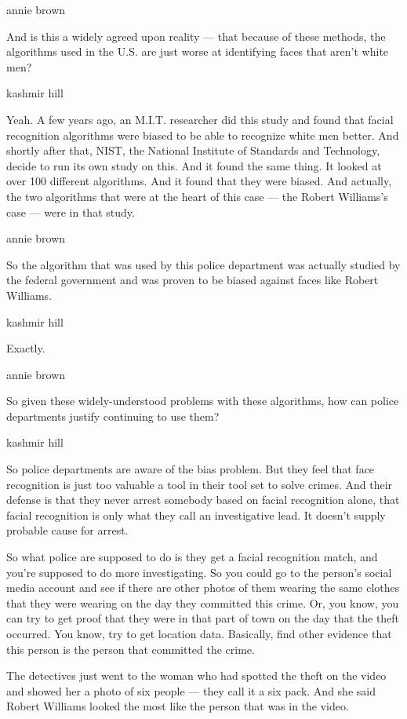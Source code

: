 annie brown

And is this a widely agreed upon reality --- that because of these
methods, the algorithms used in the U.S. are just worse at identifying
faces that aren't white men?

kashmir hill

Yeah. A few years ago, an M.I.T. researcher did this study and found
that facial recognition algorithms were biased to be able to recognize
white men better. And shortly after that, NIST, the National Institute
of Standards and Technology, decide to run its own study on this. And it
found the same thing. It looked at over 100 different algorithms. And it
found that they were biased. And actually, the two algorithms that were
at the heart of this case --- the Robert Williams's case --- were in
that study.

annie brown

So the algorithm that was used by this police department was actually
studied by the federal government and was proven to be biased against
faces like Robert Williams.

kashmir hill

Exactly.

annie brown

So given these widely-understood problems with these algorithms, how can
police departments justify continuing to use them?

kashmir hill

So police departments are aware of the bias problem. But they feel that
face recognition is just too valuable a tool in their tool set to solve
crimes. And their defense is that they never arrest somebody based on
facial recognition alone, that facial recognition is only what they call
an investigative lead. It doesn't supply probable cause for arrest.

So what police are supposed to do is they get a facial recognition
match, and you're supposed to do more investigating. So you could go to
the person's social media account and see if there are other photos of
them wearing the same clothes that they were wearing on the day they
committed this crime. Or, you know, you can try to get proof that they
were in that part of town on the day that the theft occurred. You know,
try to get location data. Basically, find other evidence that this
person is the person that committed the crime.

The detectives just went to the woman who had spotted the theft on the
video and showed her a photo of six people --- they call it a six pack.
And she said Robert Williams looked the most like the person that was in
the video.

